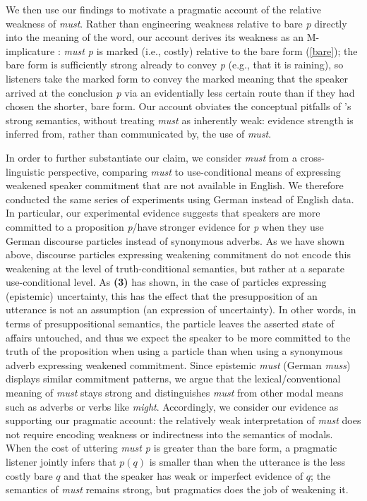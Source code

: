 \documentclass[11pt]{article}
\begin{document}
We then use our findings to motivate a pragmatic account of the relative weakness of \emph{must}. Rather than engineering weakness relative to bare \emph{p} directly into the meaning of the word, our account derives its weakness as an M-implicature \cite{grice1989,levinson2000}: \emph{must p} is marked (i.e., costly) relative to the bare form (\ref{bare}); the bare form is sufficiently strong already to convey \emph{p} (e.g., that it is raining), so listeners take the marked form to convey the marked meaning that the speaker arrived at the conclusion \emph{p} via an evidentially less certain route than if they had chosen the shorter, bare form. Our account obviates the conceptual pitfalls of \citeauthor{vonfintelgillies2010}'s strong semantics, without treating \emph{must} as inherently weak: evidence strength is inferred from, rather than communicated by, the use of \emph{must}. 

In order to further substantiate our claim, we consider \emph{must} from a cross-linguistic perspective, comparing \emph{must} to use-conditional means of expressing weakened speaker commitment that are not available in English. We therefore conducted the same series of experiments using German instead of English data. In particular, our experimental evidence suggests that speakers are more committed to a proposition \emph{p}/have stronger evidence for \emph{p} when they use German discourse particles instead of synonymous adverbs. As we have shown above, discourse particles expressing weakening commitment do not encode this weakening at the level of truth-conditional semantics, but rather at a separate use-conditional level. As \textbf{(3) }has shown, in the case of particles expressing (epistemic) uncertainty, this has the effect that the presupposition of an utterance is not an assumption (an expression of uncertainty). In other words, in terms of presuppositional semantics, the particle leaves the asserted state of affairs untouched, and thus we expect the speaker to be more committed to the truth of the proposition when using a particle than when using a synonymous adverb expressing weakened commitment. Since epistemic \emph{must} (German \emph{muss}) displays similar commitment patterns, we argue that the lexical/conventional meaning of \emph{must} stays strong and distinguishes \emph{must} from other modal means such as adverbs or verbs like \emph{might}. Accordingly, we consider our evidence as supporting our pragmatic account: the relatively weak interpretation of \emph{must} does not require encoding weakness or indirectness into the semantics of modals. When the cost of uttering \emph{must p} is greater than the bare form, a pragmatic listener jointly infers that $p(q)$ is smaller than when the utterance is the less costly bare $q$ and that the speaker has weak or imperfect evidence of $q$; the semantics of \emph{must} remains strong, but pragmatics does the job of weakening it.
\end{document}
